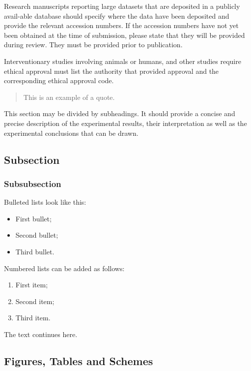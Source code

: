 \documentclass[journal,article,submit,pdftex,moreauthors]{Definitions/mdpi}
\begin{document}
Research manuscripts reporting large datasets that are deposited in a publicly avail-able database should specify where the data have been deposited and provide the relevant accession numbers. If the accession numbers have not yet been obtained at the time of submission, please state that they will be provided during review. They must be provided prior to publication.

Interventionary studies involving animals or humans, and other studies require ethical approval must list the authority that provided approval and the corresponding ethical approval code.
\begin{quote}
This is an example of a quote.
\end{quote}


This section may be divided by subheadings. It should provide a concise and precise description of the experimental results, their interpretation as well as the experimental conclusions that can be drawn.
\subsection{Subsection}
\subsubsection{Subsubsection}

Bulleted lists look like this:
\begin{itemize}
\item	First bullet;
\item	Second bullet;
\item	Third bullet.
\end{itemize}

Numbered lists can be added as follows:
\begin{enumerate}
\item	First item; 
\item	Second item;
\item	Third item.
\end{enumerate}

The text continues here. 

\subsection{Figures, Tables and Schemes}
\end{document}
